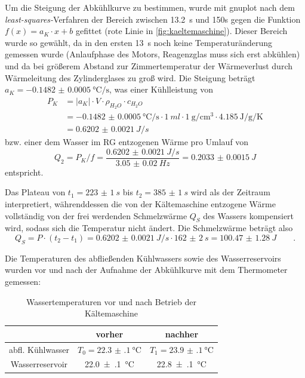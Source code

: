 Um die Steigung der Abkühlkurve zu bestimmen, wurde mit gnuplot nach dem \emph{least-squares-}Verfahren der Bereich zwischen \SI{13.2}{s} und {150}{s} gegen die Funktion $f(x)=a_K\cdot x+b$ gefittet (rote Linie in \cref{fig:kaeltemaschine}). Dieser Bereich wurde so gewählt, da in den ersten \SI{13}{s} noch keine Temperaturänderung gemessen wurde (Anlaufphase des Motors, Reagenzglas muss sich erst abkühlen) und da bei größerem Abstand zur Zimmertemperatur der Wärmeverlust durch Wärmeleitung des Zylinderglases zu groß wird.
Die Steigung beträgt $a_K=\SI{-0.1482(5)}{\degreeCelsius\per\s}$, was einer Kühlleistung von 
\begin{align}
	P_K&=|a_K|\cdot V\cdot\rho_{H_2O}\cdot c_{H_2O}\\
	&=\SI{-0.1482(5)}{\degreeCelsius\per\s}\cdot \SI{1}{ml}\cdot\SI{1}{\g\per\cubic\cm}\cdot \SI{4.185}{\joule\per\gram\per\kelvin} \\
	&=\SI{0.6202(21)}{J/s}
\label{eq:kuehlleistung}
\end{align}
bzw. einer dem Wasser im RG entzogenen Wärme pro Umlauf von 
\begin{equation}
	Q_2=P_K/f=\frac{\SI{0.6202(21)}{J/s}}{\SI{3.05(2)}{Hz}}=\SI{0.2033(15)}{J}
\label{eq:q2}
\end{equation}
entspricht.

Das Plateau von $t_1=\SI{223(1)}{s}$ bis $t_2=\SI{385(1)}{s}$ wird als der Zeitraum interpretiert, währenddessen die von der Kältemaschine entzogene Wärme vollständig von der frei werdenden Schmelzwärme $Q_S$ des Wassers kompensiert wird, sodass sich die Temperatur nicht ändert. Die Schmelzwärme beträgt also 
\begin{equation}
	Q_S=P\cdot (t_2-t_1)=\SI{0.6202(21)}{J/s}\cdot\SI{162(2)}{s}=\SI{100.47(128)}{J}\qquad.
\label{eq:schmelzberechnet}
\end{equation}

Die Temperaturen des abfließenden Kühlwassers sowie des Wasserreservoirs wurden vor und nach der Aufnahme der Abkühlkurve mit dem Thermometer gemessen:
\begin{table}[H]
\centering
\begin{tabular}{c | c c}
		& vorher & nachher  \\ \midrule
		abfl. Kühlwasser & $T_0=\SI{22.3(1)}{\degreeCelsius}$ & $T_1=\SI{23.9(1)}{\degreeCelsius}$ \\
		Wasserreservoir & \SI{22.0(1)}{\degreeCelsius} & \SI{22.8(1)}{\degreeCelsius}
\end{tabular}
\caption{Wassertemperaturen vor und nach Betrieb der Kältemaschine}
\label{tab:wassertemps}
\end{table}

